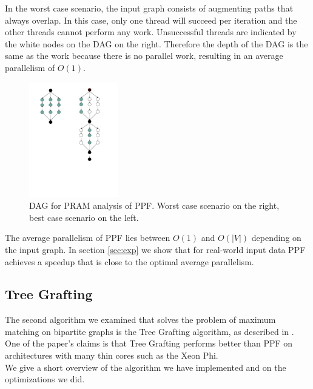 \documentclass[letterpaper]{article}
\begin{document}
In the worst case scenario, the input graph consists of augmenting paths that always overlap. 
In this case, only one thread will succeed per iteration and the other threads cannot perform any work. 
Unsuccessful threads are indicated by the white nodes on the DAG on the right. 
Therefore the depth of the DAG is the same as the work because there is no parallel work, resulting in an average parallelism of $O(1)$.\\

\begin{figure}\centering
  \includegraphics[height=5cm, trim={2.5cm 8cm 4cm 1cm}, clip]{PRAM.pdf}
  \caption{DAG for PRAM analysis of PPF. Worst case scenario on the right, best case scenario on the left.}
  \label{fig:pram}
\end{figure}

The average parallelism of PPF lies between $O(1)$ and $O(|V|)$ depending on the input graph. 
In section \ref{sec:exp} we show that for real-world input data PPF achieves a speedup that is close to the optimal average parallelism.

\subsection{Tree Grafting}\label{sec:tg}

The second algorithm we examined that solves the problem of maximum matching on bipartite graphs is the Tree Grafting algorithm, as described in \cite{Azad:2015}. One of the paper's claims is that Tree Grafting performs better than PPF on architectures with many thin cores such as the Xeon Phi. \\
We give a short overview of the algorithm we have implemented and on the optimizations we did. \\
\end{document}
